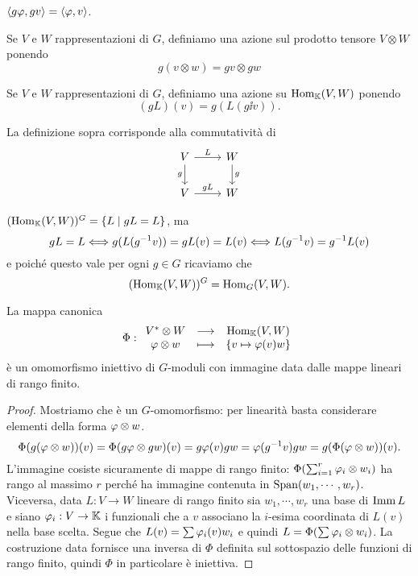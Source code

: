 \begin{remark}
$\left\langle {g\varphi,gv}\right\rangle=\left\langle {\varphi,v}\right\rangle$.
\end{remark}

\begin{definition}
Se $V$ e $W$ rappresentazioni di $G$, definiamo una azione sul prodotto tensore $V\otimes W$ ponendo
\[g(v\otimes w)=gv\otimes gw\]
\end{definition}

\begin{definition}[Omomorfismi]
    Se $V$ e $W$ rappresentazioni di $G$, definiamo una azione su $\operatorname{Hom}_{\mathbb{K}}(V,W)$ ponendo 
    \[(gL)(v)=g(L(g\ii v)).\]
\end{definition}
\begin{remark}
La definizione sopra corrisponde alla commutativit\`a di
\[\begin{tikzcd}
	V & W \\
	V & W
	\arrow["L", from=1-1, to=1-2]
	\arrow["g"', from=1-1, to=2-1]
	\arrow["g", from=1-2, to=2-2]
	\arrow["gL", from=2-1, to=2-2]
\end{tikzcd}\]
\end{remark}
\begin{remark}
$(\operatorname{Hom}_{\mathbb{K}}(V,W))^G=\left\{{L\mid gL=L}\right\}$, ma
\[gL=L\Longleftrightarrow g(L(g^{-1} v))=gL(v)=L(v)\Longleftrightarrow L(g^{-1} v)=g^{-1} L(v)\]
e poich\'e questo vale per ogni $g\in G$ ricaviamo che
\[(\operatorname{Hom}_{\mathbb{K}}(V,W))^G=\operatorname{Hom}_G(V,W).\]
\end{remark}


\begin{proposition}[]
La mappa canonica
\[\Phi:\begin{array}{ccc} {V^\ast\otimes W} & \longrightarrow & {\operatorname{Hom}_{\mathbb{K}}(V,W)}\\ {\varphi\otimes w} & \longmapsto & {\left\{{v\mapsto \varphi(v)w}\right\}} \end{array}\]
\`e un omomorfismo iniettivo di $G$-moduli con immagine data dalle mappe lineari di rango finito.
\end{proposition}
\begin{proof}
Mostriamo che \`e un $G$-omomorfismo: per linearit\`a basta considerare elementi della forma $\varphi\otimes w$.
\[\Phi(g(\varphi\otimes w))(v)=\Phi(g\varphi\otimes gw)(v)=g\varphi(v)gw=\varphi(g^{-1} v)gw=g(\Phi(\varphi\otimes w))(v).\]
L'immagine cosiste sicuramente di mappe di rango finito: $\Phi(\sum_{i=1}^r \varphi_i\otimes w_i)$ ha rango al massimo $r$ perch\'e ha immagine contenuta in $\operatorname{Span}(w_1,\cdots, w_r)$. Viceversa, data $L:V\to W$ lineare di rango finito sia $w_1,\cdots, w_r$ una base di $\operatorname{Imm} L$ e siano $\varphi_i:V\to \mathbb{K}$ i funzionali che a $v$ associano la $i$-esima coordinata di $L(v)$ nella base scelta. Segue che $L(v)=\sum \varphi_i(v)w_i$ e quindi $L=\Phi(\sum \varphi_i\otimes w_i)$. La costruzione data fornisce una inversa di $\Phi$ definita sul sottospazio delle funzioni di rango finito, quindi $\Phi$ in particolare \`e iniettiva.
\end{proof}

